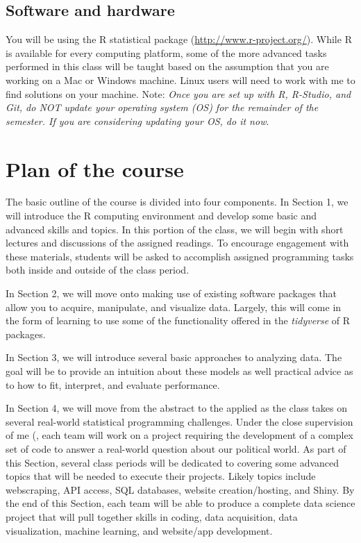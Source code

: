 \documentclass[11pt]{article}
\begin{document}
\subsection*{Software and hardware}

You will be using the R statistical package
(\url{http://www.r-project.org/}). While R is available for every
computing platform, some of the more advanced tasks performed in this
class will be taught based on the assumption that you are working on a
Mac or Windows machine.  Linux users will need to work with me to find
solutions on your machine.  Note: \textit{Once you are set up with R,
  R-Studio, and Git, do NOT update your operating system (OS) for the
  remainder of the semester.  If you are considering updating your OS,
  do it now}.



\section*{Plan of the course}

The basic outline of the course is divided into four components. In
Section 1, we will introduce the R computing environment and develop
some basic and advanced skills and topics.  In this portion of the
class, we will begin with short lectures and discussions of the
assigned readings. To encourage engagement with these materials,
students will be asked to accomplish assigned programming tasks both
inside and outside of the class period. 

In Section 2, we will move onto making use of existing software
packages that allow you to acquire, manipulate, and visualize
data. Largely, this will come in the form of learning to use some of
the functionality offered in the \textit{tidyverse} of R packages.

In Section 3, we will introduce several basic approaches to analyzing
data.  The goal will be to provide an intuition about these models as
well practical advice as to how to fit, interpret, and evaluate performance.  

In Section 4, we will move from the abstract to the applied as the
class takes on several real-world statistical programming challenges.
Under the close supervision of me (, each team will work on a project
requiring the development of a complex set of code to answer a
real-world question about our political world.  As part of this
Section, several class periods will be dedicated to covering some
advanced topics that will be needed to execute their projects.  Likely
topics include webscraping, API access, SQL databases, website
creation/hosting, and Shiny.  By the end of this Section, each team
will be able to produce a complete data science project that will pull
together skills in coding, data acquisition, data visualization,
machine learning, and website/app development.
\end{document}
